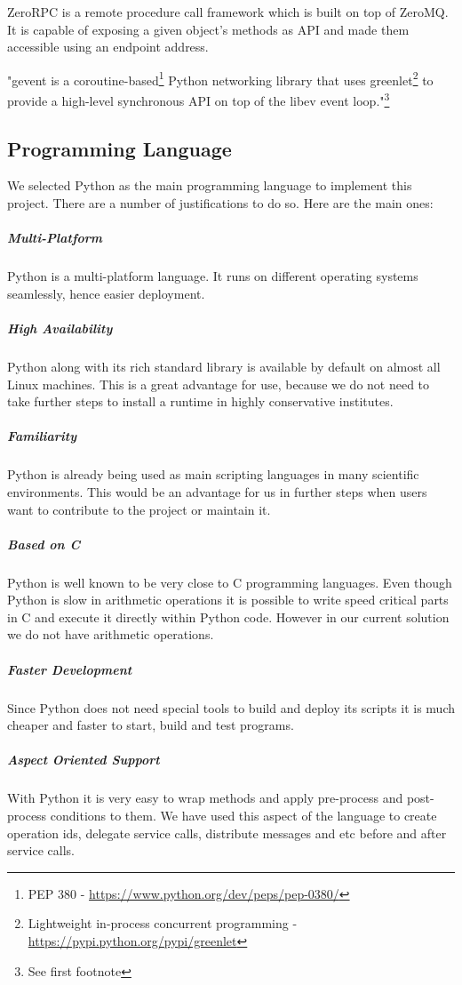ZeroRPC is a remote procedure call framework which is built on top of ZeroMQ.
It is capable of exposing a given object's methods as API and made them accessible using an endpoint address.

"gevent is a coroutine-based\footnote{PEP 380 - \url{https://www.python.org/dev/peps/pep-0380/}}
Python networking library that 
uses greenlet\footnote{Lightweight in-process concurrent programming - \url{https://pypi.python.org/pypi/greenlet}} 
to provide a high-level synchronous API on top of the libev event loop."\footnote{See first footnote}


\subsection{Programming Language}
We selected Python as the main programming language to implement this project. 
There are a number of justifications to do so. Here are the main ones:

\subparagraph{Multi-Platform} Python is a multi-platform language. It runs on different operating systems
seamlessly, hence easier deployment.
\subparagraph{High Availability} Python along with its rich standard library is available by default on almost all Linux machines. This
is a great advantage for use, because we do not need to take further steps to install a runtime in highly conservative institutes.
\subparagraph{Familiarity} Python is already being used as main scripting languages in many scientific environments. This would be an advantage
for us in further steps when users want to contribute to the project or maintain it.
\subparagraph{Based on C} Python is well known to be very close to C programming languages. Even though Python is slow in arithmetic operations
it is possible to write speed critical parts in C and execute it directly within Python code. However in our current solution we do not have
arithmetic operations.
\subparagraph{Faster Development} Since Python does not need special tools to build and deploy its scripts it is much cheaper and faster
to start, build and test programs.
\subparagraph{Aspect Oriented Support} With Python it is very easy to wrap methods and apply pre-process and post-process conditions to them. We have
used this aspect of the language to create operation ids, delegate service calls, distribute messages and etc before and after service calls.


